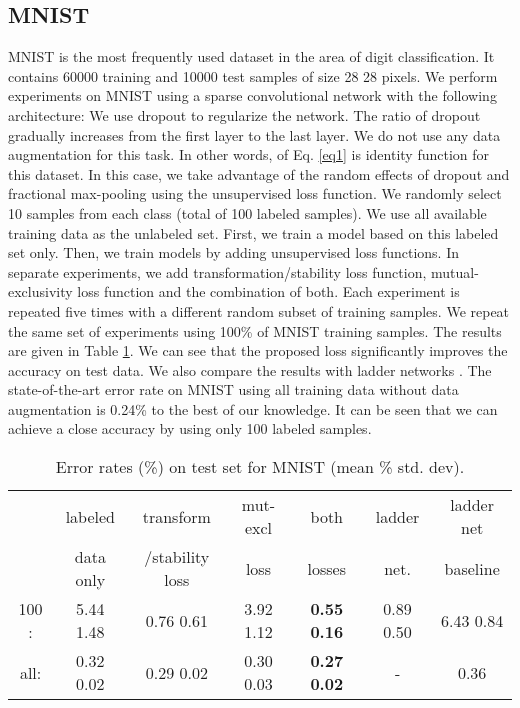\documentclass{article}
\begin{document}
\subsection{MNIST}
\vspace{-0.1cm}
MNIST is the most frequently used dataset in the area of digit classification. It contains 60000 training and 10000 test samples of size 28  28 pixels. We perform experiments on MNIST using a sparse convolutional network with the following architecture:  We use dropout to regularize the network. The ratio of dropout gradually increases from the first layer to the last layer. We do not use any data augmentation for this task. In other words,  of Eq. \ref{eq1} is identity function for this dataset. In this case, we take advantage of the random effects of dropout and fractional max-pooling using the unsupervised loss function. We randomly select 10 samples from each class (total of 100 labeled samples). We use all available training data as the unlabeled set. First, we train a model based on this labeled set only. Then, we train models by adding unsupervised loss functions. In separate experiments, we add transformation/stability loss function, mutual-exclusivity loss function and the combination of both. Each experiment is repeated five times with a different random subset of training samples. We repeat the same set of experiments using 100\% of MNIST training samples. The results are given in Table \ref{tab5}. We can see that the proposed loss significantly improves the accuracy on test data. We also compare the results with ladder networks \cite{rasmus2015semi}. The state-of-the-art error rate on MNIST using all training data without data augmentation is 0.24\% \cite{chang2015batch} to the best of our knowledge. It can be seen that we can achieve a close accuracy by using only 100 labeled samples.
\begin{table}[h]
  \caption{Error rates (\%) on test set for MNIST (mean \%  std. dev).}
  \begin{center}
  \begin{tabular}{ c  c  c  c  c  c  c}
    & labeled & transform & mut-excl  & both & ladder & ladder net\\
 \rule[-1.2ex]{0pt}{0ex}	 &  data only  &  /stability loss &  loss \cite{mutualexclusive}  &   losses  & net. \cite{rasmus2015semi}  &  baseline \cite{rasmus2015semi} \\ \hline     
 \rule{0pt}{3ex}     100 :    &   5.44  1.48    &  0.76  0.61     &  3.92  1.12  &  {\bf 0.55  0.16} &  0.89  0.50  &  6.43  0.84 \\
                     all: &   0.32  0.02   &  0.29  0.02    &  0.30  0.03   &  {\bf 0.27  0.02} &   -  &  0.36 \\              
  \end{tabular}  
  \end{center}
  \label{tab5}
\end{table}
\vspace{-0.2cm}
\end{document}
